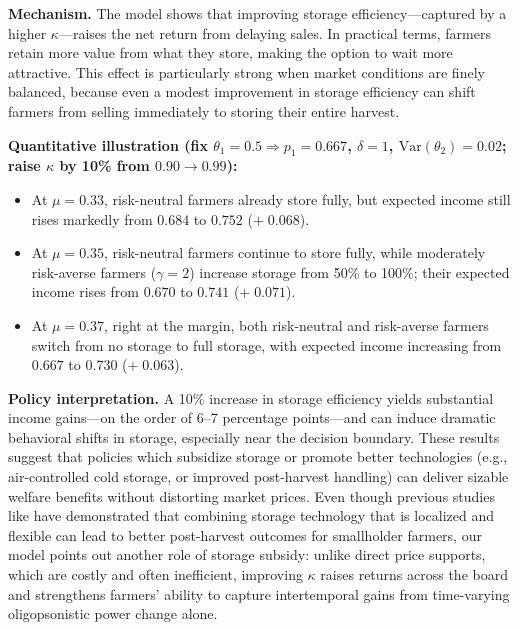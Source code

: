 \textbf{Mechanism.} The model shows that improving storage efficiency---captured by a higher $\kappa$---raises the net return from delaying sales. In practical terms, farmers retain more value from what they store, making the option to wait more attractive. This effect is particularly strong when market conditions are finely balanced, because even a modest improvement in storage efficiency can shift farmers from selling immediately to storing their entire harvest.

\textbf{Quantitative illustration (fix $\theta_1=0.5 \Rightarrow p_1=0.667$, $\delta=1$, $\text{Var}(\theta_2)=0.02$; raise $\kappa$ by 10\% from $0.90 \to 0.99$):}
\begin{itemize}
  \item At $\mu=0.33$, risk-neutral farmers already store fully, but expected income still rises markedly from $0.684$ to $0.752$ ($+\;0.068$).
  \item At $\mu=0.35$, risk-neutral farmers continue to store fully, while moderately risk-averse farmers ($\gamma=2$) increase storage from 50\% to 100\%; their expected income rises from $0.670$ to $0.741$ ($+\;0.071$).
  \item At $\mu=0.37$, right at the margin, both risk-neutral and risk-averse farmers switch from no storage to full storage, with expected income increasing from $0.667$ to $0.730$ ($+\;0.063$).
\end{itemize}

\textbf{Policy interpretation.} A 10\% increase in storage efficiency yields substantial income gains---on the order of 6--7 percentage points---and can induce dramatic behavioral shifts in storage, especially near the decision boundary. These results suggest that policies which subsidize storage or promote better technologies (e.g., air-controlled cold storage, or improved post-harvest handling) can deliver sizable welfare benefits without distorting market prices. Even though previous studies like \cite{nindi2024incentive} have demonstrated that combining storage technology that is localized and flexible can lead to better post-harvest outcomes for smallholder farmers, our model points out another role of storage subsidy: unlike direct price supports, which are costly and often inefficient, improving $\kappa$ raises returns across the board and strengthens farmers' ability to capture intertemporal gains from time-varying oligopsonistic power change alone.  






